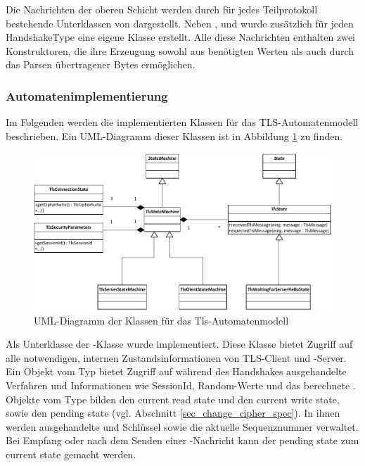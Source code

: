 Die Nachrichten der oberen Schicht werden durch für jedes Teilprotokoll bestehende Unterklassen von  dargestellt. Neben ,  und  wurde zusätzlich für jeden HandshakeType eine eigene Klasse erstellt. Alle diese Nachrichten enthalten zwei Konstruktoren, die ihre Erzeugung sowohl aus benötigten Werten als auch durch das Parsen übertragener Bytes ermöglichen. 

\subsubsection{Automatenimplementierung}
Im Folgenden werden die implementierten Klassen für das TLS-Automatenmodell beschrieben. Ein UML-Diagramm dieser Klassen ist in Abbildung \ref{fig_uml_tls_state_machine} zu finden.

\begin{figure}
	\centering
	\includegraphics[scale=0.9]{Diagrams/uml/tls_state_machine.pdf} 
	\caption{UML-Diagramm der Klassen für das Tls-Automatenmodell}
	\label{fig_uml_tls_state_machine}
\end{figure}

Als Unterklasse der -Klasse wurde  implementiert. Diese Klasse bietet Zugriff auf alle notwendigen, internen Zustandsinformationen von TLS-Client und -Server. Ein Objekt vom Typ  bietet Zugriff auf während des Handshakes ausgehandelte Verfahren und Informationen wie SessionId, Random-Werte und das berechnete \mastersecret{}. Objekte vom Type  bilden den current read state und den current write state, sowie den pending state (vgl. Abschnitt \ref{sec_change_cipher_spec}). In ihnen werden ausgehandelte \ciphersuite{} und Schlüssel sowie die aktuelle Sequenznummer verwaltet. Bei Empfang oder nach dem Senden einer \changecipherspec{}-Nachricht kann der pending state zum current state gemacht werden.

